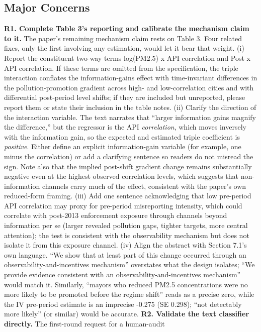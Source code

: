 \documentclass[
  11pt,
]{article}
\begin{document}
\subsection{Major Concerns}\label{major-concerns}

\textbf{R1. Complete Table 3's reporting and calibrate the mechanism
claim to it.} The paper's remaining mechanism claim rests on Table 3.
Four related fixes, only the first involving any estimation, would let
it bear that weight. (i) Report the constituent two-way terms log(PM2.5)
x API correlation and Post x API correlation. If these terms are omitted
from the specification, the triple interaction conflates the
information-gains effect with time-invariant differences in the
pollution-promotion gradient across high- and low-correlation cities and
with differential post-period level shifts; if they are included but
unreported, please report them or state their inclusion in the table
notes. (ii) Clarify the direction of the interaction variable. The text
narrates that ``larger information gains magnify the difference,'' but
the regressor is the API \emph{correlation}, which moves inversely with
the information gain, so the expected and estimated triple coefficient
is \emph{positive}. Either define an explicit information-gain variable
(for example, one minus the correlation) or add a clarifying sentence so
readers do not misread the sign. Note also that the implied post-shift
gradient change remains substantially negative even at the highest
observed correlation levels, which suggests that non-information
channels carry much of the effect, consistent with the paper's own
reduced-form framing. (iii) Add one sentence acknowledging that low
pre-period API correlation may proxy for pre-period misreporting
intensity, which could correlate with post-2013 enforcement exposure
through channels beyond information per se (larger revealed pollution
gaps, tighter targets, more central attention); the test is consistent
with the observability mechanism but does not isolate it from this
exposure channel. (iv) Align the abstract with Section 7.1's own
language. ``We show that at least part of this change occurred through
an observability-and-incentives mechanism'' overstates what the design
isolates; ``We provide evidence consistent with an
observability-and-incentives mechanism'' would match it. Similarly,
``mayors who reduced PM2.5 concentrations were no more likely to be
promoted before the regime shift'' reads as a precise zero, while the IV
pre-period estimate is an imprecise -0.275 (SE 0.298); ``not detectably
more likely'' (or similar) would be accurate. \textbf{R2. Validate the
text classifier directly.} The first-round request for a human-audit
\end{document}
